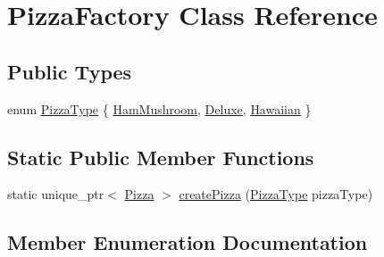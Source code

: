\hypertarget{classPizzaFactory}{}\section{Pizza\+Factory Class Reference}
\label{classPizzaFactory}
\subsection*{Public Types}
\begin{DoxyCompactItemize}
\item 
enum \hyperlink{classPizzaFactory_a247cf751b7af4fd338a14303c9e67fe4}{Pizza\+Type} \{ \hyperlink{classPizzaFactory_a247cf751b7af4fd338a14303c9e67fe4ab47db230a75b01a1a531d9374a57dc23}{Ham\+Mushroom}, 
\hyperlink{classPizzaFactory_a247cf751b7af4fd338a14303c9e67fe4ae05ccf2778af31944f7205f550c33e8b}{Deluxe}, 
\hyperlink{classPizzaFactory_a247cf751b7af4fd338a14303c9e67fe4a43552967e3be1afe8d7bf89feb21ba4e}{Hawaiian}
 \}
\end{DoxyCompactItemize}
\subsection*{Static Public Member Functions}
\begin{DoxyCompactItemize}
\item 
static unique\+\_\+ptr$<$ \hyperlink{classPizza}{Pizza} $>$ \hyperlink{classPizzaFactory_ae03b206abf337720e9f019eb735d6131}{create\+Pizza} (\hyperlink{classPizzaFactory_a247cf751b7af4fd338a14303c9e67fe4}{Pizza\+Type} pizza\+Type)
\end{DoxyCompactItemize}


\subsection{Member Enumeration Documentation}
